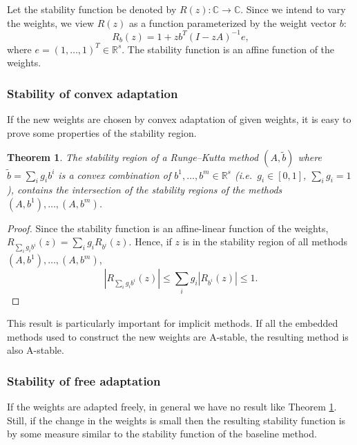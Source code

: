 \documentclass[a4paper]{article}
\numberwithin{equation}{section}
\theoremstyle{plain}
\newtheorem{theorem}{Theorem}
\theoremstyle{definition}
\numberwithin{theorem}{section}
\newcommand{\R}{\mathbb{R}}
\newcommand{\CN}{\mathbb{C}}
\newcommand{\1}{\mathbbm{1}}
\newcommand{\bt}{\tilde{b}}
\begin{document}
Let the stability function be denoted by $R(z): \CN \to \CN$.
Since we intend to vary the weights, we view $R(z)$
as a function parameterized by the weight vector $b$:
\begin{equation}
R_b(z) = 1 + zb^T(I - zA)^{-1}e,
\end{equation}
where $e = (1, \dots, 1)^T \in \R^s$.
The stability function is an affine function of the weights.

\subsubsection{Stability of convex adaptation}

If the new weights are chosen by convex adaptation of given weights,
it is easy to prove some properties of the stability region.
\begin{theorem} \label{thm:stability-region}
  The stability region of a Runge--Kutta method $(A,\bt)$ where
  $\bt = \sum_{i} g_i b^i$ is a convex combination of
  $b^1, \dots, b^m \in \R^s$ (i.e.\ $g_i \in [0,1]$, $\sum_i g_i = 1$),
  contains the intersection of the stability regions of
  the methods $(A,b^1), \dots, (A,b^m)$.
\end{theorem}
\begin{proof}
  Since the stability function is an affine-linear function of the
  weights, $R_{\sum_i g_i b^i}(z) = \sum_i g_i R_{b^i}(z)$. Hence,
  if $z$ is in the stability region of all methods $(A,b^1), \dots, (A,b^m)$,
  \begin{equation}
    | R_{\sum_i g_i b^i}(z) |
    \le
    \sum_i g_i | R_{b^i}(z) |
    \le
    1.
  \end{equation}
\end{proof}

This result is particularly important for implicit methods.
If all the embedded methods used to construct the new weights
are A-stable, the resulting method is also A-stable.


\subsubsection{Stability of free adaptation}
If the weights are adapted freely, in general we have no result like Theorem \ref{thm:stability-region}.
Still, if the change in the weights is small then the resulting stability
function is by some measure similar to the stability function of the baseline
method.
\end{document}
